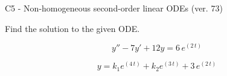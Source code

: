 \begin{exercise}
  \begin{exerciseTitle}C5 - Non-homogeneous second-order linear ODEs (ver. 73)\end{exerciseTitle}
  \begin{exerciseStatement}
    
Find the solution to the given ODE.

    
\[y''-7y'+12y = 6 \, e^{\left(2 \, t\right)}\]

  \end{exerciseStatement}
  \begin{exerciseAnswer}
    
\[y= k_{1} e^{\left(4 \, t\right)} + k_{2} e^{\left(3 \, t\right)} + 3 \, e^{\left(2 \, t\right)}\]

  \end{exerciseAnswer}
\end{exercise}